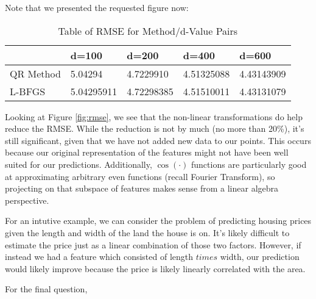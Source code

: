 \documentclass[submit]{harvardml}
\theoremstyle{plain}
\begin{document}
Note that we presented the requested figure now:
\begin{figure}[h!]
\end{figure}
\begin{table}[h!]
\centering
\caption{Table of RMSE for Method/d-Value Pairs}
\label{my-label}
\begin{tabular}{|l|l|l|l|l|}
\hline
          & d=100      & d=200      & d=400      & d=600      \\ \hline
QR Method & 5.04294    & 4.7229910  & 4.51325088 & 4.43143909 \\ \hline
L-BFGS    & 5.04295911 & 4.72298385 & 4.51510011 & 4.43131079 \\ \hline
\end{tabular}
\end{table}
Looking at Figure \ref{fig:rmse}, we see that the non-linear transformations do help reduce the RMSE. While the reduction is not by much (no more than 20\%), it's still significant, given that we have not added new data to our points. This occurs because our original representation of the features might not have been well suited for our predictions. Additionally, $\cos(\cdot)$ functions are particularly good at approximating arbitrary even functions (recall Fourier Transform), so projecting on that subspace of features makes sense from a linear algebra perspective.

For an intutive example, we can consider the problem of predicting housing prices given the length and width of the land the house is on. It's likely difficult to estimate the price just as a linear combination of those two factors. However, if instead we had a feature which consisted of length $
times$ width, our prediction would likely improve because the price is likely linearly correlated with the area.

For the final question,
\end{document}
